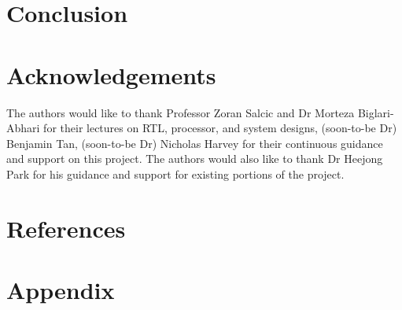 \documentclass[]{article}
\begin{document}
	
	
	\section{Conclusion}
	
	
	
	\section{Acknowledgements}
	The authors would like to thank Professor Zoran Salcic and Dr Morteza Biglari-Abhari for their lectures on RTL, processor, and system designs, (soon-to-be Dr) Benjamin Tan, (soon-to-be Dr) Nicholas Harvey for their continuous guidance and support on this project. The authors would also like to thank Dr Heejong Park for his guidance and support for existing portions of the project.
	
	
	\section{References}
	
	
	
	\section*{Appendix}
	
	
	
\end{document}
